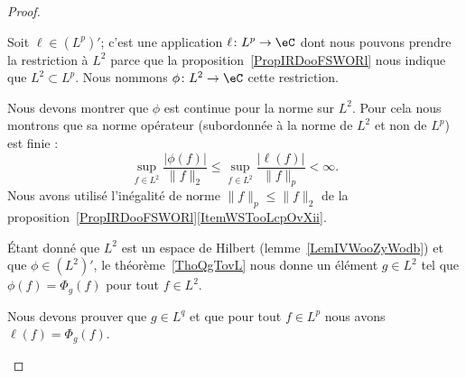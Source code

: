 \begin{proof}
\begin{subproof}
		\spitem[Surjectif]

		Soit \( \ell\in (L^p)'\); c'est une application \( \ell\colon L^p\to \eC\) dont nous pouvons prendre la restriction à \( L^2\) parce que la proposition~\ref{PropIRDooFSWORl} nous indique que \( L^2\subset L^p\). Nous nommons \( \phi\colon L^2\to \eC\) cette restriction.

		\begin{subproof}

			\spitem[\( \phi\in (L^2)'\)]

			Nous devons montrer que \( \phi\) est continue pour la norme sur \( L^2\). Pour cela nous montrons que sa norme opérateur (subordonnée à la norme de \( L^2\) et non de \( L^p\)) est finie :
			\begin{equation}
				\sup_{f\in L^2}\frac{ | \phi(f) | }{ \| f \|_{2} }\leq \sup_{f\in L^2}\frac{ | \ell(f) | }{ \| f \|_p }<\infty.
			\end{equation}
			Nous avons utilisé l'inégalité de norme \( \| f \|_p\leq \| f \|_2\) de la proposition~\ref{PropIRDooFSWORl}\ref{ItemWSTooLcpOvXii}.


			Étant donné que \( L^2\) est un espace de Hilbert (lemme~\ref{LemIVWooZyWodb}) et que \( \phi\in (L^2)'\), le théorème~\ref{ThoQgTovL} nous donne un élément \( g\in L^2\) tel que \( \phi(f)=\Phi_g(f)\) pour tout \( f\in L^2\).

			Nous devons prouver que \( g\in L^q\) et que pour tout \( f\in L^p\) nous avons \( \ell(f)=\Phi_g(f)\).

			\spitem[\( g\in L^q\)]


\end{subproof}
\end{subproof}
\end{proof}
